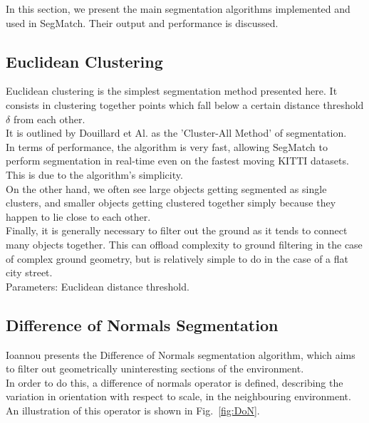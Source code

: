 In this section, we present the main segmentation algorithms implemented and used in SegMatch. Their output and performance is discussed.\\

\subsection{Euclidean Clustering}
\label{subsec:euclidean}

Euclidean clustering is the simplest segmentation method presented here. It consists in clustering together points which fall below a certain distance threshold $\delta$ from each other.\\

It is outlined by Douillard et Al. \cite{douillard2011segmentation} as the 'Cluster-All Method' of segmentation.\\

In terms of performance, the algorithm is very fast, allowing SegMatch to perform segmentation in real-time even on the fastest moving KITTI \cite{KITTI} datasets. This is due to the algorithm's simplicity.\\

On the other hand, we often see large objects getting segmented as single clusters, and smaller objects getting clustered together simply because they happen to lie close to each other.\\

Finally, it is generally necessary to filter out the ground as it tends to connect many objects together. This can offload complexity to ground filtering in the case of complex ground geometry, but is relatively simple to do in the case of a flat city street.\\

Parameters: Euclidean distance threshold.

\subsection{Difference of Normals Segmentation}
\label{subsec:DoN}

Ioannou \cite{ioannou2012difference} presents the Difference of Normals segmentation algorithm, which aims to filter out geometrically uninteresting sections of the environment.\\

In order to do this, a difference of normals operator is defined, describing the variation in orientation with respect to scale, in the neighbouring environment. An illustration of this operator is shown in Fig.~\ref{fig:DoN}.\\


